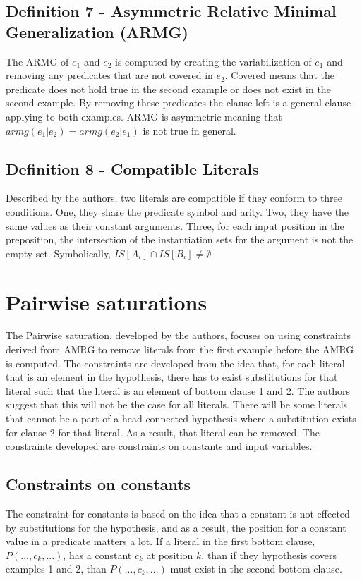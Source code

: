 \documentclass[jair,twoside,11pt,theapa]{article}
\begin{document}
\subsection{Definition 7 - Asymmetric Relative Minimal Generalization (ARMG)}
The ARMG of $e_1$ and $e_2$ is computed by creating the variabilization of $e_1$ and removing any predicates that are not covered in $e_2$. Covered means that the predicate does not hold true in the second example or does not exist in the second example. By removing these predicates the clause left is a general clause applying to both examples. ARMG is asymmetric meaning that $armg(e_1|e_2) = armg(e_2|e_1)$ is not true in general. 

\subsection{Definition 8 - Compatible Literals}
Described by the authors, two literals are compatible if they conform to three conditions. One, they share the predicate symbol and arity. Two, they have the same values as their constant arguments. Three, for each input position in the preposition, the intersection of the instantiation sets for the argument is not the empty set. Symbolically, $IS[A_i] \cap IS[B_i] \not = \emptyset$ 


\section{Pairwise saturations}
The Pairwise saturation, developed by the authors, focuses on using constraints derived from AMRG to remove literals from the first example before the AMRG is computed. The constraints are developed from the idea that, for each literal that is an element in the hypothesis, there has to exist substitutions for that literal such that the literal is an element of bottom clause 1 and 2. 
The authors suggest that this will not be the case for all literals. There will be some literals that cannot be a part of a head connected hypothesis where a substitution exists for clause 2 for that literal. As a result, that literal can be removed. The constraints developed are constraints on constants and input variables. 

\subsection{Constraints on constants}
The constraint for constants is based on the idea that a constant is not effected by substitutions for the hypothesis, and as a result, the position for a constant value in a predicate matters a lot. If a literal in the first bottom clause, $P(...,c_k,...)$, has a constant $c_k$ at position $k$, than if they hypothesis covers examples 1 and 2, than $P(...,c_k,...)$ must exist in the second bottom clause. 
\end{document}
